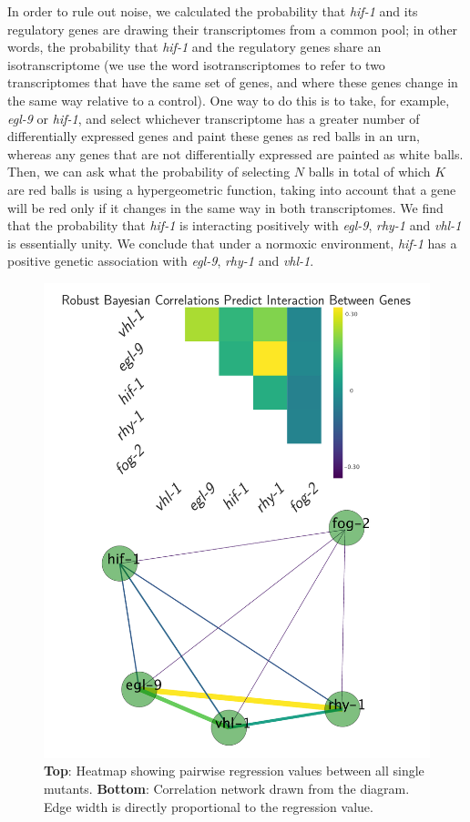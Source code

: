 \documentclass[9pt,twocolumn,twoside]{pnas-new}
\newcommand{\egl}{\emph{egl-9}}
\newcommand{\rhy}{\emph{rhy-1}}
\newcommand{\vhl}{\emph{vhl-1}}
\newcommand{\hif}{\emph{hif-1}}
\begin{document}
In order to rule out noise, we calculated the probability that \hif{} and its regulatory genes are drawing their transcriptomes from a common pool; in other words, the probability that \hif{} and the regulatory genes share an isotranscriptome (we use the word isotranscriptomes to refer to two transcriptomes that have the same set of genes, and where these genes change in the same way relative to a control).
One way to do this is to take, for example, \egl{} or \hif{}, and select whichever transcriptome has a greater number of differentially expressed genes and paint these genes as red balls in an urn, whereas any genes that are not differentially expressed are painted as white balls. Then, we can ask what the probability of selecting $N$ balls in total of which $K$ are red balls is using a hypergeometric function, taking into account that a gene will be red only if it changes in the same way in both transcriptomes. We find that the probability that \hif{} is interacting positively with \egl{}, \rhy{} and \vhl{} is essentially unity. We conclude that under a normoxic environment, \hif{} has a positive genetic association with \egl{}, \rhy{} and \vhl{}.
\begin{figure}[tbhp]
\centering
\includegraphics[width=.8\linewidth]{figs/bayesian_heat_map.pdf}
\caption{\textbf{Top}: Heatmap showing pairwise regression values between all single mutants. \textbf{Bottom}: Correlation network drawn from the diagram. Edge width is directly proportional to the regression value.}
\label{fig:heatmap}
\end{figure}
\end{document}
